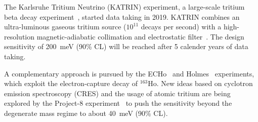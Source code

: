 The Karlsruhe Tritium Neutrino (KATRIN) experiment, a large-scale tritium beta decay experiment~\cite{Angrik:2005ep}, started data taking in 2019. KATRIN combines an ultra-luminous gaseous tritium source ($10^{11}$ decays per second) with a high-resolution magnetic-adiabatic collimation and electrostatic filter~\cite{Otten:2008zz,Lobashev:1985mu, PICARD1992345}. The design sensitivity of 200~meV (90\% CL) will be reached after 5 calender years of data taking. 

A complementary approach is pursued by the ECHo~\cite{Gastaldo:2017edk} and Holmes~\cite{Giachero:2016xnn} experiments, which exploit the electron-capture decay of $^{163}$Ho. New ideas based on cyclotron emission spectroscopy (CRES) and the usage of atomic tritium are being explored by the Project-8 experiment~\cite{Esfahani:2017dmu} to push the sensitivity beyond the degenerate mass regime to about 40~meV (90\% CL).

